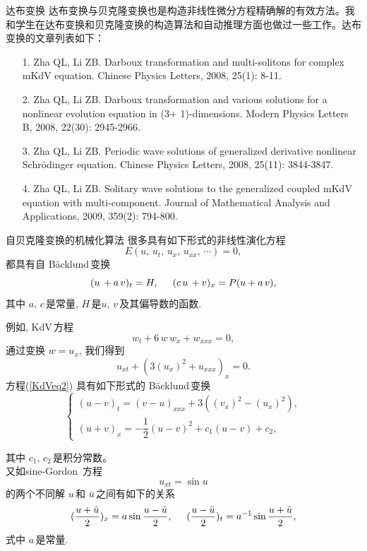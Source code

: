 \documentclass{beamer}
\begin{document}
\begin{frame}{达布变换}
  达布变换与贝克隆变换也是构造非线性微分方程精确解的有效方法。我和学生在达布变换和贝克隆变换的构造算法和自动推理方面也做过一些工作。达布变换的文章列表如下：
\begin{itemize}
  \item[1.] Zha QL, Li ZB. Darboux transformation and multi-solitons for complex mKdV equation. Chinese Physics Letters, 2008, 25(1): 8-11.
  \item[2.]	Zha QL, Li ZB. Darboux transformation and various solutions for a nonlinear evolution equation in (3+ 1)-dimensions. Modern Physics Letters B, 2008, 22(30): 2945-2966.
  \item[3.]	Zha QL, Li ZB. Periodic wave solutions of generalized derivative nonlinear Schrödinger equation. Chinese Physics Letters, 2008, 25(11): 3844-3847.
  \item[4.] Zha QL, Li ZB. Solitary wave solutions to the generalized coupled mKdV equation with multi-component. Journal of Mathematical Analysis and Applications, 2009, 359(2): 794-800.
\end{itemize}
\end{frame}
\begin{frame}{自贝克隆变换的机械化算法}
很多具有如下形式的非线性演化方程
\begin{equation}\label{eq344}
E(u,\,u_t,\,u_x,\,u_{xx},\,\cdots)=0,
\end{equation}
都具有自 B\"{a}cklund\,变换
\begin{equation}\label{eq345}
(u\,+ a\,v)_t = H,\hskip 0.5cm (c\,u\, + v)_x =P(u + a\,v),
\end{equation}
其中 $a,\,c$\,是常量, $H$\,是$u,\,v$\,及其偏导数的函数.

例如, KdV\,方程
\begin{equation}\label{KdV}
w_t+6\,w\,w_x+w_{xxx}=0,
\end{equation}
通过变换 $w=u_x$, 我们得到
\begin{equation}\label{KdVeq2}
u_{xt}+(3(u_x)^2+u_{xxx})_x=0.
\end{equation}
方程(\ref{KdVeq2}) 具有如下形式的 B\"{a}cklund\,变换
\begin{equation}\label{KdV_BT}
\left \{
\begin{array}{ll}
(u-v)_t=(v-u)_{xxx}+3((v_x)^2-(u_x)^2), \\[2mm]
(u+v)_x=-\dfrac{1}{2}(u-v)^2+c_1(u-v)+c_2,
\end{array}
\right.
\end{equation}
\end{frame}
\begin{frame}
其中 $c_1,\,c_2$\,是积分常数。\\[1mm]

又如sine-Gordon\, 方程
\[
  u_{xt} = \sin u
\]
的两个不同解 $u$\,和 $\bar{u}$\,之间有如下的关系
\begin{equation}
(\dfrac{u +\bar{u}}{2})_x = a \sin \dfrac{u-\bar{u}}{2}, \hskip
0.5cm (\dfrac{u-\bar{u}}{2})_t = a^{-1} \sin \dfrac{u + \bar{u}}{2},
\end{equation}
式中 $a$\,是常量.
\end{frame}
\end{document}

